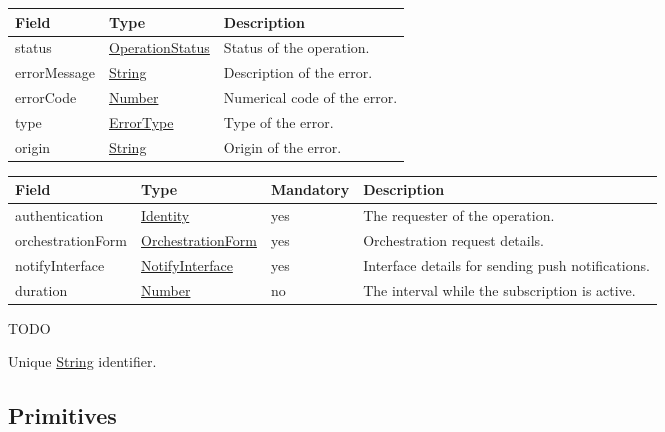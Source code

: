 \documentclass[a4paper]{arrowhead}
\newcommand{\pref}[1]{{\textcolor{ArrowheadGrey}{\hyperref[sec:model:primitives:#1]{#1}}}}
\begin{document}

\begin{table}[ht!]
\begin{tabularx}{\textwidth}{| p{4.25cm} | p{3.5cm} | X |} \hline
\rowcolor{gray!33} Field & Type      & Description \\ \hline
status & \pref{OperationStatus} & Status of the operation. \\ \hline
errorMessage & \pref{String} & Description of the error. \\ \hline
errorCode &\pref{Number}  & Numerical code of the error. \\ \hline
type & \pref{ErrorType} & Type of the error. \\ \hline
origin & \pref{String} & Origin of the error. \\ \hline
\end{tabularx}
\end{table}


\begin{table}[ht!]
\begin{tabularx}{\textwidth}{| p{3.2cm} | p{3.5cm} | p{2cm} | X |} \hline
\rowcolor{gray!33} Field & Type & Mandatory & Description \\ \hline
authentication & \hyperref[sec:model:Identity]{Identity} & yes & The requester of the operation. \\ \hline
orchestrationForm & \hyperref[sec:model:OrchestrationForm]{OrchestrationForm} & yes & Orchestration request details. \\ \hline
notifyInterface & \hyperref[sec:model:NotifyInterface]{NotifyInterface} & yes & Interface details for sending push notifications. \\ \hline
duration & \pref{Number} & no & The interval while the subscription is active.  \\ \hline
\end{tabularx}
\end{table}


TODO


Unique \pref{String} identifier. 

\subsection{Primitives}
\label{sec:model:primitives}
\end{document}

